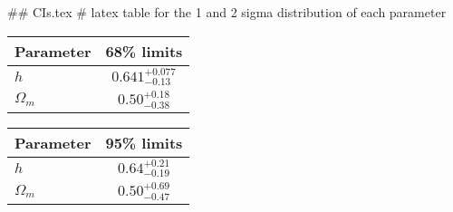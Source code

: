 ## CIs.tex
# latex table for the 1 and 2 sigma distribution of each parameter

\begin{tabular} { l  c}
 Parameter &  68\% limits\\
\hline
{\boldmath$h              $} & $0.641^{+0.077}_{-0.13}    $\\
{\boldmath$\Omega_m       $} & $0.50^{+0.18}_{-0.38}      $\\
\hline
\end{tabular}

\begin{tabular} { l  c}
 Parameter &  95\% limits\\
\hline
{\boldmath$h              $} & $0.64^{+0.21}_{-0.19}      $\\
{\boldmath$\Omega_m       $} & $0.50^{+0.69}_{-0.47}      $\\
\hline
\end{tabular}
